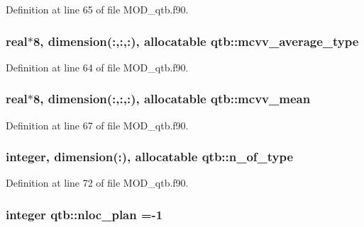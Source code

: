 Definition at line 65 of file M\-O\-D\-\_\-qtb.\-f90.

\hypertarget{classqtb_a30c387f210847d0817a3db9f94a2f80d}{
\subsubsection[{mcvv\-\_\-average\-\_\-type}]{\setlength{\rightskip}{0pt plus 5cm}real$\ast$8, dimension(\-:,\-:,\-:), allocatable qtb\-::mcvv\-\_\-average\-\_\-type}}\label{classqtb_a30c387f210847d0817a3db9f94a2f80d}


Definition at line 64 of file M\-O\-D\-\_\-qtb.\-f90.

\hypertarget{classqtb_ae65a01ddbd5ca81d368d7150200b4a51}{
\subsubsection[{mcvv\-\_\-mean}]{\setlength{\rightskip}{0pt plus 5cm}real$\ast$8, dimension(\-:,\-:,\-:), allocatable qtb\-::mcvv\-\_\-mean}}\label{classqtb_ae65a01ddbd5ca81d368d7150200b4a51}


Definition at line 67 of file M\-O\-D\-\_\-qtb.\-f90.

\hypertarget{classqtb_a381e32b5b6088fc1c209199abedc5129}{
\subsubsection[{n\-\_\-of\-\_\-type}]{\setlength{\rightskip}{0pt plus 5cm}integer, dimension(\-:), allocatable qtb\-::n\-\_\-of\-\_\-type}}\label{classqtb_a381e32b5b6088fc1c209199abedc5129}


Definition at line 72 of file M\-O\-D\-\_\-qtb.\-f90.

\hypertarget{classqtb_ae7544bfdc2b805f539c32e20bfabf0f1}{
\subsubsection[{nloc\-\_\-plan}]{\setlength{\rightskip}{0pt plus 5cm}integer qtb\-::nloc\-\_\-plan =-\/1}}\label{classqtb_ae7544bfdc2b805f539c32e20bfabf0f1}



